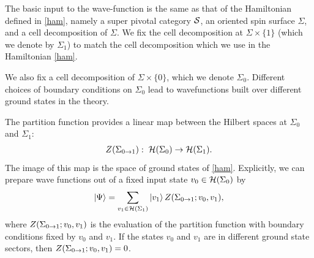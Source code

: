 The basic input to the wave-function is the same as that of the Hamiltonian defined in \eqref{ham}, namely 
a super pivotal category $\mathcal{S}$, an oriented spin surface $\Sigma$, and a cell decomposition of $\Sigma$.
We fix the cell decomposition at $\Sigma \times \{ 1 \} $ (which we denote by $\Sigma_1$) to match the cell decomposition which we use in the Hamiltonian \eqref{ham}.

We also fix a cell decomposition of $\Sigma \times \{0\}$, which we denote $\Sigma_0$.
Different choices of boundary conditions on $\Sigma_0$ lead to wavefunctions built
over different ground states in the theory. 

The partition function provides a linear map between the Hilbert spaces at $\Sigma_0$ and $\Sigma_1$:
\begin{align}
Z(\Sigma_{0\rightarrow1} ): \; \mathcal{H}(\Sigma_0) \rightarrow \mathcal{H}(\Sigma_1).
\end{align}
The image of this map is the space of ground states of \eqref{ham}.
Explicitly, we can prepare wave functions out of a fixed input state $v_0\in \mathcal{H}(\Sigma_0)$ by
%
\begin{align}\label{GroundState}
\left|\Psi\right\rangle = \sum_{v_1 \in \mathcal{H}(\Sigma_1)} \left|v_1\right\rangle Z(\Sigma_{0\rightarrow1}; v_0, v_1),
\end{align}
where $Z(\Sigma_{0\rightarrow1}; v_0, v_1)$ is the evaluation of the partition function with 
boundary conditions fixed by $v_0$ and $v_1$. 
If the states $v_0$ and $v_1$ are in different ground state sectors, then $Z(\Sigma_{0\rightarrow1};v_0,v_1)=0$. 

